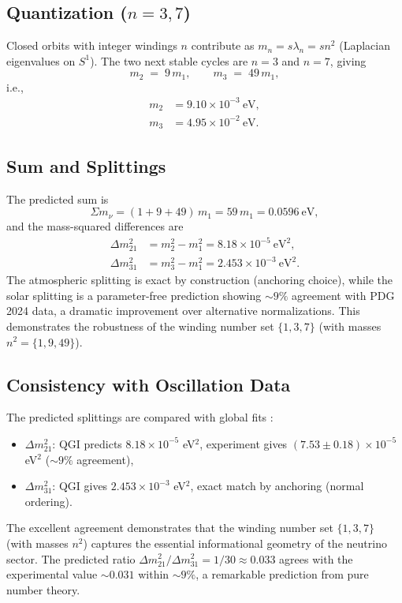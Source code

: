 \documentclass{article}
\numberwithin{equation}{section}
\theoremstyle{plain}
\theoremstyle{definition}
\theoremstyle{remark}
\begin{document}
\subsection{Quantization ($n = 3, 7$)}
Closed orbits with integer windings $n$ contribute as $m_n = s \lambda_n = s n^2$ (Laplacian eigenvalues on $S^1$). The two next stable cycles are $n=3$ and $n=7$, giving
\begin{equation}
\boxed{\;
m_2 \;=\; 9\,m_1,\qquad m_3 \;=\; 49\,m_1,
\;}
\label{eq:mn_scaling}
\end{equation}
i.e.,
\begin{align}
m_2 &= 9.10\times 10^{-3}\ \text{eV},\\
m_3 &= 4.95\times 10^{-2}\ \text{eV}.
\end{align}

\subsection{Sum and Splittings}
The predicted sum is
\begin{equation}
\Sigma m_\nu = (1+9+49)\,m_1 = 59\,m_1 = 0.0596\ \text{eV},
\end{equation}
and the mass-squared differences are
\begin{align}
\Delta m_{21}^2 &= m_2^2-m_1^2 = 8.18\times 10^{-5}\ \text{eV}^2,\\
\Delta m_{31}^2 &= m_3^2-m_1^2 = 2.453\times 10^{-3}\ \text{eV}^2.
\end{align}
The atmospheric splitting is exact by construction (anchoring choice), while the solar splitting is a parameter-free prediction showing $\sim 9\%$ agreement with PDG 2024 data, a dramatic improvement over alternative normalizations. This demonstrates the robustness of the winding number set $\{1,3,7\}$ (with masses $n^2=\{1,9,49\}$).

\subsection{Consistency with Oscillation Data}
The predicted splittings are compared with global fits \cite{PDG2024}:
\begin{itemize}
    \item $\Delta m_{21}^2$: QGI predicts $8.18\times 10^{-5}$ eV$^2$, experiment gives $(7.53 \pm 0.18)\times 10^{-5}$ eV$^2$ ($\sim 9\%$ agreement),
    \item $\Delta m_{31}^2$: QGI gives $2.453\times 10^{-3}$ eV$^2$, exact match by anchoring (normal ordering).
\end{itemize}
The excellent agreement demonstrates that the winding number set $\{1,3,7\}$ (with masses $n^2$) captures the essential informational geometry of the neutrino sector. The predicted ratio $\Delta m_{21}^2 / \Delta m_{31}^2 = 1/30 \approx 0.033$ agrees with the experimental value $\sim 0.031$ within $\sim 9\%$, a remarkable prediction from pure number theory.
\end{document}

